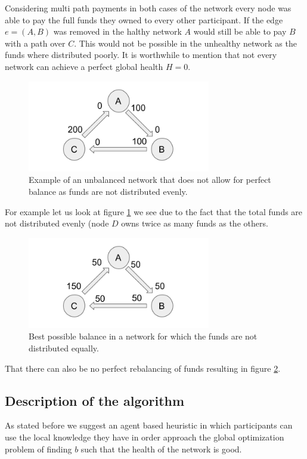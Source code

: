 \documentclass[a4paper]{paper}
\begin{document}
Considering multi path payments in both cases of the network every node was able to pay the full funds they owned to every other participant.
If the edge $e=(A,B)$ was removed in the halthy network $A$ would still be able to pay $B$ with a path over $C$.
This would not be possible in the unhealthy network as the funds where distributed poorly.
It is worthwhile to mention that not every network can achieve a perfect global health $H=0$.
\begin{figure}
 \centering
 \includegraphics[width=8cm]{img/oddUnbalanced.png}
 \caption{Example of an unbalanced network that does not allow for perfect balance as funds are not distributed evenly.}
 \label{fig:oddUnbalanced}
\end{figure}
For example let us look at figure \ref{fig:oddUnbalanced} we see due to the fact that the total funds are not distributed evenly (node $D$ owns twice as many funds as the others.

\begin{figure}
 \centering
 \includegraphics[width=8cm]{img/oddBalanced.png}
 \caption{Best possible balance in a network for which the funds are not distributed equally.}
 \label{fig:oddBalanced}
\end{figure}
That there can also be no perfect rebalancing of funds resulting in figure \ref{fig:oddBalanced}.

\subsection{Description of the algorithm}\label{sec:Algorithm}
As stated before we suggest an agent based heuristic in which participants can use the local knowledge they have in order approach the global optimization problem of finding $b$ such that the health of the network is good.
\end{document}
